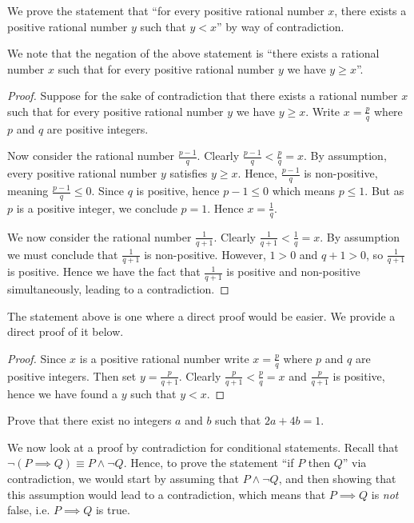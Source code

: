 \begin{example}
    We prove the statement that ``for every positive rational number $x$, there exists a positive rational number $y$ such that $y < x$'' by way of contradiction.

    We note that the negation of the above statement is ``there exists a rational number $x$ such that for every positive rational number $y$ we have $y \geq x$''.
    \begin{proof}
        Suppose for the sake of contradiction that there exists a rational number $x$ such that for every positive rational number $y$ we have $y \geq x$. Write $x = \frac pq$ where $p$ and $q$ are positive integers.

        Now consider the rational number $\frac{p-1}{q}$. Clearly $\frac{p-1}{q} < \frac pq = x$. By assumption, every positive rational number $y$ satisfies $y \geq x$. Hence, $\frac{p-1}{q}$ is non-positive, meaning $\frac{p-1}{q} \leq 0$. Since $q$ is positive, hence $p - 1 \leq 0$ which means $p \leq 1$. But as $p$ is a positive integer, we conclude $p = 1$. Hence $x = \frac 1q$.

        We now consider the rational number $\frac{1}{q+1}$. Clearly $\frac{1}{q+1} < \frac{1}{q} = x$. By assumption we must conclude that $\frac{1}{q+1}$ is non-positive. However, $1 > 0$ and $q + 1 > 0$, so $\frac{1}{q+1}$ is positive. Hence we have the fact that $\frac{1}{q+1}$ is positive and non-positive simultaneously, leading to a contradiction.
    \end{proof}
\end{example}
\begin{remark}
    The statement above is one where a direct proof would be easier. We provide a direct proof of it below.
    \begin{proof}
        Since $x$ is a positive rational number write $x = \frac pq$ where $p$ and $q$ are positive integers. Then set $y = \frac{p}{q+1}$. Clearly $\frac{p}{q+1} < \frac{p}{q} = x$ and $\frac{p}{q+1}$ is positive, hence we have found a $y$ such that $y < x$.
    \end{proof}
\end{remark}

\begin{exercise}
    Prove that there exist no integers $a$ and $b$ such that $2a + 4b = 1$.
\end{exercise}

We now look at a proof by contradiction for conditional statements. Recall that $\lnot(P \implies Q) \equiv P \land \lnot Q$. Hence, to prove the statement ``if $P$ then $Q$'' via contradiction, we would start by assuming that $P \land \lnot Q$, and then showing that this assumption would lead to a contradiction, which means that $P \implies Q$ is \textit{not} false, i.e. $P\implies Q$ is true.

